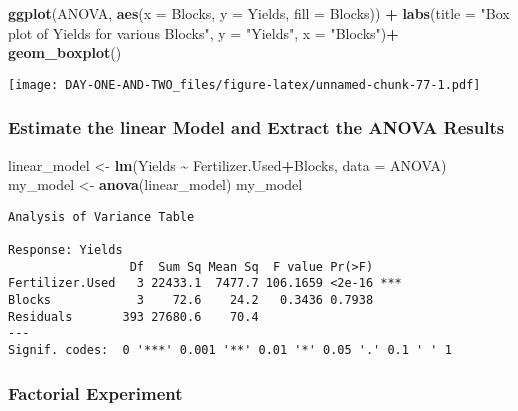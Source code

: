 \documentclass[
]{article}
\newenvironment{Shaded}{\begin{snugshade}}{\end{snugshade}}
\newcommand{\AttributeTok}[1]{\textcolor[rgb]{0.13,0.29,0.53}{#1}}
\newcommand{\FunctionTok}[1]{\textcolor[rgb]{0.13,0.29,0.53}{\textbf{#1}}}
\newcommand{\NormalTok}[1]{#1}
\newcommand{\OtherTok}[1]{\textcolor[rgb]{0.56,0.35,0.01}{#1}}
\newcommand{\SpecialCharTok}[1]{\textcolor[rgb]{0.81,0.36,0.00}{\textbf{#1}}}
\newcommand{\StringTok}[1]{\textcolor[rgb]{0.31,0.60,0.02}{#1}}
\begin{document}
\begin{Shaded}
\begin{Highlighting}[]
\FunctionTok{ggplot}\NormalTok{(ANOVA, }\FunctionTok{aes}\NormalTok{(}\AttributeTok{x =}\NormalTok{ Blocks, }\AttributeTok{y =}\NormalTok{ Yields, }\AttributeTok{fill =}\NormalTok{ Blocks)) }\SpecialCharTok{+}
  \FunctionTok{labs}\NormalTok{(}\AttributeTok{title =} \StringTok{"Box plot of Yields for various Blocks"}\NormalTok{, }\AttributeTok{y =} \StringTok{"Yields"}\NormalTok{, }\AttributeTok{x =} \StringTok{"Blocks"}\NormalTok{)}\SpecialCharTok{+}
  \FunctionTok{geom\_boxplot}\NormalTok{()}
\end{Highlighting}
\end{Shaded}

\texttt{[image: DAY-ONE-AND-TWO\_files/figure-latex/unnamed-chunk-77-1.pdf]}

\hypertarget{estimate-the-linear-model-and-extract-the-anova-results}{%
\subsubsection{Estimate the linear Model and Extract the ANOVA
Results}\label{estimate-the-linear-model-and-extract-the-anova-results}}

\begin{Shaded}
\begin{Highlighting}[]
\NormalTok{linear\_model }\OtherTok{\textless{}{-}} \FunctionTok{lm}\NormalTok{(Yields }\SpecialCharTok{\textasciitilde{}}\NormalTok{ Fertilizer.Used}\SpecialCharTok{+}\NormalTok{Blocks, }\AttributeTok{data =}\NormalTok{ ANOVA)}
\NormalTok{my\_model }\OtherTok{\textless{}{-}} \FunctionTok{anova}\NormalTok{(linear\_model)}
\NormalTok{my\_model}
\end{Highlighting}
\end{Shaded}

\begin{verbatim}
Analysis of Variance Table

Response: Yields
                 Df  Sum Sq Mean Sq  F value Pr(>F)    
Fertilizer.Used   3 22433.1  7477.7 106.1659 <2e-16 ***
Blocks            3    72.6    24.2   0.3436 0.7938    
Residuals       393 27680.6    70.4                    
---
Signif. codes:  0 '***' 0.001 '**' 0.01 '*' 0.05 '.' 0.1 ' ' 1
\end{verbatim}

\hypertarget{factorial-experiment}{%
\subsubsection{Factorial Experiment}\label{factorial-experiment}}
\end{document}

